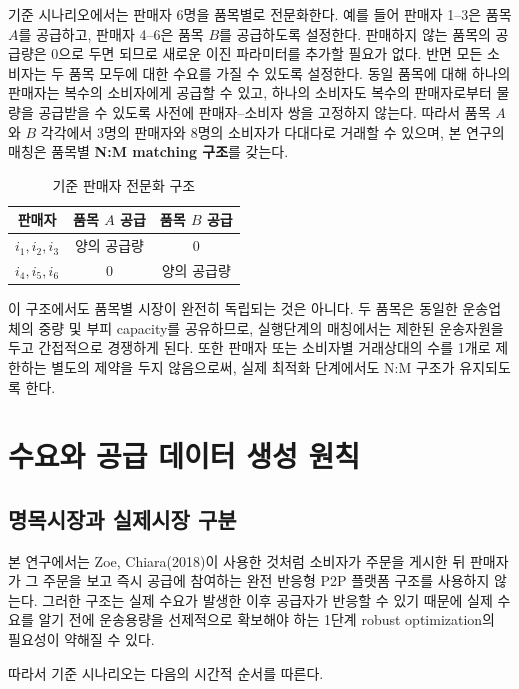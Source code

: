 \documentclass[11pt,a4paper]{article}
\begin{document}
기준 시나리오에서는 판매자 6명을 품목별로 전문화한다.
예를 들어 판매자 1--3은 품목 $A$를 공급하고,
판매자 4--6은 품목 $B$를 공급하도록 설정한다.
판매하지 않는 품목의 공급량은 0으로 두면 되므로 새로운 이진 파라미터를 추가할 필요가 없다.
반면 모든 소비자는 두 품목 모두에 대한 수요를 가질 수 있도록 설정한다.
동일 품목에 대해 하나의 판매자는 복수의 소비자에게 공급할 수 있고,
하나의 소비자도 복수의 판매자로부터 물량을 공급받을 수 있도록 사전에 판매자--소비자 쌍을 고정하지 않는다.
따라서 품목 $A$와 $B$ 각각에서 3명의 판매자와 8명의 소비자가 다대다로 거래할 수 있으며,
본 연구의 매칭은 품목별 
\textbf{N:M matching 구조}를 갖는다.

\begin{table}[h!]
\centering
\caption{기준 판매자 전문화 구조}
\begin{tabular}{ccc}
\toprule
\textbf{판매자} & \textbf{품목 $A$ 공급} & \textbf{품목 $B$ 공급} \\
\midrule
$i_1,i_2,i_3$ & 양의 공급량 & 0 \\
$i_4,i_5,i_6$ & 0 & 양의 공급량 \\
\bottomrule
\end{tabular}
\end{table}

이 구조에서도 품목별 시장이 완전히 독립되는 것은 아니다.
두 품목은 동일한 운송업체의 중량 및 부피 capacity를 공유하므로,
실행단계의 매칭에서는 제한된 운송자원을 두고 간접적으로 경쟁하게 된다.
또한 판매자 또는 소비자별 거래상대의 수를 1개로 제한하는 별도의 제약을 두지 않음으로써,
실제 최적화 단계에서도 N:M 구조가 유지되도록 한다.

\section{수요와 공급 데이터 생성 원칙}

\subsection{명목시장과 실제시장 구분}

본 연구에서는 Zoe, Chiara(2018)이 사용한 것처럼 소비자가 주문을 게시한 뒤 판매자가 그 주문을 보고 즉시 공급에 참여하는
완전 반응형 P2P 플랫폼 구조를 사용하지 않는다.
그러한 구조는 실제 수요가 발생한 이후 공급자가 반응할 수 있기 때문에
실제 수요를 알기 전에 운송용량을 선제적으로 확보해야 하는 1단계 robust optimization의 필요성이 약해질 수 있다.

따라서 기준 시나리오는 다음의 시간적 순서를 따른다.
\end{document}
